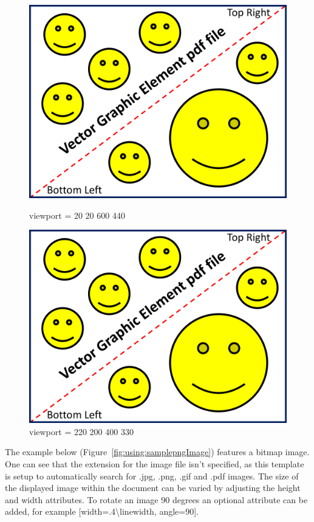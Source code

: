 \begin{figure}[H]
\begin{minipage}[t]{7.4cm}
\begin{center}
\includegraphics*[viewport= 20 20 600 440, width=.8\linewidth]{usingLatex/images/VectorGraphicElementPDF.pdf}
\caption{viewport = 20 20 600 440}
\label{fig:using:Example1}
\end{center}
\end{minipage}
\hfill
\begin{minipage}[t]{7.4cm}
\begin{center}
\includegraphics*[viewport= 220 200 400 330, width=.8\linewidth]{usingLatex/images/VectorGraphicElementPDF.pdf}
\caption{viewport = 220 200 400 330}
\label{fig:using:Example2}
\end{center}
\end{minipage}
\end{figure}

The example below (Figure~\ref{fig:using:samplepngImage}) features a bitmap image. One can see that the extension for the image file isn't specified, as this template is setup to automatically search for .jpg, .png, .gif and .pdf images. The size of the displayed image within the document can be varied by adjusting the height and width attributes. To rotate an image 90 degrees an optional attribute can be added, for example [width=.4\textbackslash linewidth, angle=90].


